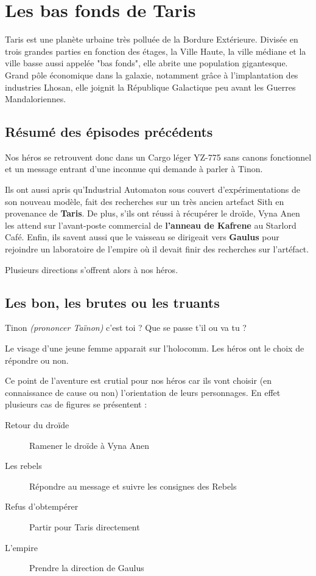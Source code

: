 \section{Les bas fonds de Taris}

Taris est une planète urbaine très polluée de la Bordure Extérieure. Divisée en trois grandes parties en fonction des étages, la Ville Haute, la ville médiane et la ville basse aussi appelée "bas fonds", elle abrite une population gigantesque. Grand pôle économique dans la galaxie, notamment grâce à l’implantation des industries Lhosan, elle joignit la République Galactique peu avant les Guerres Mandaloriennes. 

\subsection{Résumé des épisodes précédents}
Nos héros se retrouvent donc dans un Cargo léger YZ-775 sans canons fonctionnel et un message entrant d’une inconnue qui demande à parler à Tinon.

Ils ont aussi apris qu’Industrial Automaton sous couvert d’expérimentations de son nouveau modèle, fait des recherches sur un très ancien artefact Sith en provenance de \textbf{Taris}. De plus, s’ils ont réussi à récupérer le droïde, Vyna Anen les attend sur l’avant-poste commercial de \textbf{l’anneau de Kafrene} au Starlord Café. Enfin, ils savent aussi que le vaisseau se dirigeait vers \textbf{Gaulus} pour rejoindre un laboratoire de l’empire où il devait finir des recherches sur l’artéfact.

Plusieurs directions s’offrent alors à nos héros.

\subsection{Les bon, les brutes ou les truants}
\begin{quotebox}
    Tinon \emph{(prononcer Taïnon)} c’est toi ? Que se passe t’il ou va tu ?
\end{quotebox}
Le visage d’une jeune femme apparait sur l’holocomm. Les héros ont le choix de répondre ou non.

Ce point de l’aventure est crutial pour nos héros car ils vont choisir (en connaissance de cause ou non) l’orientation de leurs personnages. En effet plusieurs cas de figures se présentent :

\begin{description}
    \item[Retour du droïde] Ramener le droïde à Vyna Anen
    \item[Les rebels] Répondre au message et suivre les consignes des Rebels
    \item[Refus d’obtempérer] Partir pour Taris directement
    \item[L’empire] Prendre la direction de Gaulus
\end{description}


